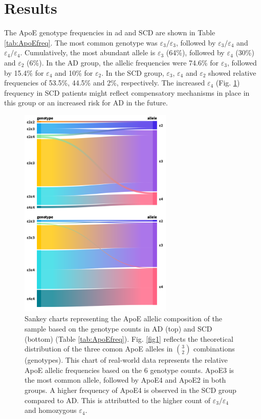 \documentclass{amsart}
\begin{document}
\section{Results} \label{results}
The ApoE genotype frequencies in \acrshort{ad} and SCD are shown in Table \ref{tab:ApoEfreq}. The most common genotype was $\varepsilon_3/\varepsilon_3$, followed by $\varepsilon_3/\varepsilon_4$ and $\varepsilon_4/\varepsilon_4$. Cumulatively, the most abundant allele is $\varepsilon_3$ (64\%), followed by $\varepsilon_4$ (30\%) and $\varepsilon_2$ (6\%). In the AD group, the allelic frequencies were 74.6\% for $\varepsilon_3$, followed by 15.4\% for $\varepsilon_4$ and 10\% for $\varepsilon_2$. In the SCD group, $\varepsilon_3$, $\varepsilon_4$ and $\varepsilon_2$ showed relative frequencies of 53.5\%, 44.5\% and 2\%, respectively. The increased $\varepsilon_4$ (Fig. \ref{plot:sankey}) frequency in SCD patients might reflect compensatory mechanisms in place in this group or an increased risk for AD in the future.
\begin{figure}[H]
  \includegraphics[width=0.65\textwidth]{figures/sankey@2x.png}
    \caption{\label{plot:sankey} Sankey charts representing the ApoE allelic composition of the sample based on the genotype counts in AD (top) and SCD (bottom) (Table \ref{tab:ApoEfreq}). Fig. \ref{fig1} reflects the theoretical distribution of the three comon ApoE alleles in $\binom{3}{2}$ combinations (genotypes). This chart of real-world data represents the relative ApoE allelic frequencies based on the 6 genotype counts. ApoE3 is the most common allele, followed by ApoE4 and ApoE2 in both groups. A higher frequency of ApoE4 is observed in the SCD group compared to AD. This is attributted to the higher count of $\varepsilon_3/\varepsilon_4$ and homozygous $\varepsilon_4$.}
\end{figure}
\end{document}
